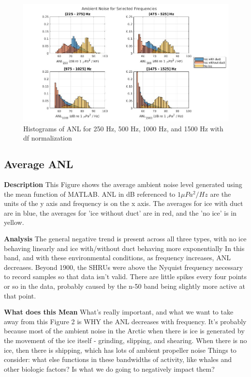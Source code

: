 \begin{figure}[H]
\centering
\includegraphics[scale=0.5]{Figures/selected_hists.jpg}
\caption{Histograms of ANL for 250 Hz, 500 Hz, 1000 Hz, and 1500 Hz with df normalization}
\label{fig_selhist}
\end{figure}

\subsection{Average ANL}
\textbf{Description}
This Figure shows the average ambient noise level generated using the mean function of MATLAB. ANL in dB referenced to $ 1 \mu Pa^{2}/Hz$ are the units of the y axis and frequency is on the x axis. The averages for ice with duct are in blue, the averages for 'ice without duct' are in red, and the 'no ice' is in yellow.

\textbf{Analysis}
The general negative trend is present across all three types, with no ice behaving linearly and ice with/without duct behaving more exponentially
In this band, and with these environmental conditions, as frequency increases, ANL decreases. Beyond 1900, the SHRUs were above the Nyquist frequency necessary to record samples so that data isn’t valid. 
There are little spikes every four points or so in the data, probably caused by the n-50 band being slightly more active at that point.

\textbf{What does this Mean}
What’s really important, and what we want to take away from this Figure 2 is WHY the ANL decreases with frequency. It’s probably because most of the ambient noise in the Arctic when there is ice is generated by the movement of the ice itself - grinding, slipping, and shearing. When there is no ice, then there is shipping, which has lots of ambient propeller noise
Things to consider: what else functions in these bandwidths of activity, like whales and other biologic factors? Is what we do going to negatively impact them?


